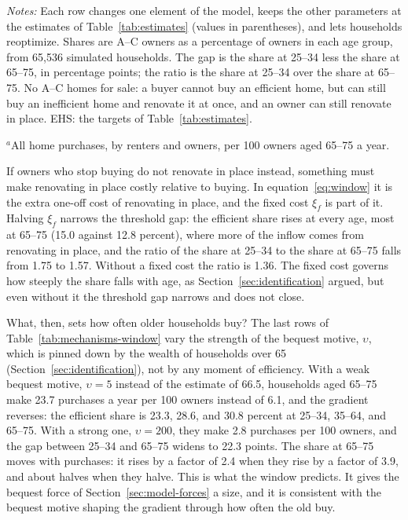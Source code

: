 \begin{table}[t]
  \centering
  \caption[The efficient share of owners when the window changes]{{The efficient share of owners when the window changes}}\label{tab:mechanisms-window}
  \begin{threeparttable}
    \small
    \begin{tablenotes}[flushleft]\footnotesize
      \item {\textit{Notes:} Each row changes one element of the
      model, keeps the other parameters at the estimates of
      Table~\ref{tab:estimates} (values in parentheses), and lets households
      reoptimize. Shares are A--C owners as a percentage of owners in each
      age group, from 65,536 simulated households. The gap is the share at
      25--34 less the share at 65--75, in percentage points; the ratio is
      the share at 25--34 over the share at 65--75. No A--C homes for sale: a buyer
      cannot buy an efficient home, but can still buy an inefficient home and
      renovate it at once, and an owner can still renovate in place. EHS: the
      targets of Table~\ref{tab:estimates}.}
      \item {$^a$All home purchases, by renters and owners, per 100
      owners aged 65--75 a year.}
    \end{tablenotes}
  \end{threeparttable}
\end{table}

If owners who stop buying do not renovate in place instead, something must
make renovating in place costly relative to buying. In
equation~\eqref{eq:window} it is the extra one-off cost of renovating in
place, and the fixed cost $\xi_f$ is part of it. Halving $\xi_f$ narrows the
threshold gap: the efficient share rises at every age, most at 65--75 (15.0 against
12.8 percent), where more of the inflow comes from renovating in place, and
the ratio of the share at 25--34 to the share at 65--75 falls from 1.75 to
1.57. Without a fixed cost the ratio is 1.36. The fixed cost governs how
steeply the share falls with age, as Section~\ref{sec:identification}
argued, but even without it the threshold gap narrows and does not close.

What, then, sets how often older households buy? The last rows of
Table~\ref{tab:mechanisms-window} vary the strength of the bequest motive,
$\upsilon$, which is pinned down by the wealth of households over 65
(Section~\ref{sec:identification}), not by any moment of efficiency. With a
weak bequest motive, $\upsilon=5$ instead of the estimate
of 66.5, households aged 65--75 make 23.7 purchases a year per 100 owners
instead of 6.1, and the gradient reverses: the efficient share is 23.3,
28.6, and 30.8 percent at 25--34, 35--64, and 65--75. With a strong one,
$\upsilon=200$, they make 2.8 purchases per 100 owners, and the gap between
25--34 and 65--75 widens to 22.3 points. The share at 65--75 moves with
purchases: it rises by a factor of 2.4 when they rise by a factor of 3.9,
and about halves when they halve. This is what the window predicts. It
gives the bequest force of Section~\ref{sec:model-forces} a size, and it is
consistent with the bequest motive shaping the gradient through how often
the old buy. 

